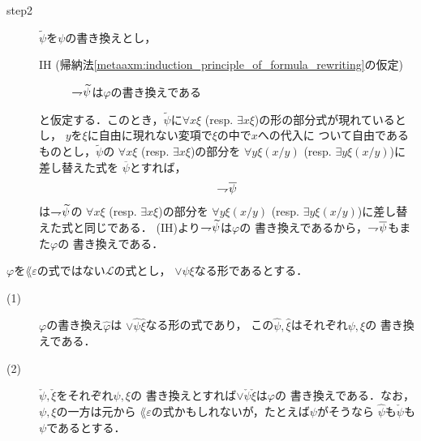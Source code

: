 \begin{metaprf}
\begin{description}
\begin{description}
					\item[step2]
						$\widetilde{\psi}$を$\psi$の書き換えとし，
						\begin{description}
							\item[IH (帰納法\ref{metaaxm:induction_principle_of_formula_rewriting}の仮定)]
								$\rightharpoondown\hspace{-0.25em} \widetilde{\psi}$は$\varphi$の書き換えである
						\end{description}
						と仮定する．このとき，$\widetilde{\psi}$に$\forall x \xi$ 
						(resp. $\exists x \xi$)の形の部分式が現れているとし，
						$y$を$\xi$に自由に現れない変項で$\xi$の中で$x$への代入に
						ついて自由であるものとし，$\widetilde{\psi}$の
						$\forall x \xi$ (resp. $\exists x \xi$)の部分を
						$\forall y \xi(x/y)$
						(resp. $\exists y \xi(x/y)$)に差し替えた式を
						$\overline{\psi}$とすれば，
						\begin{align}
							\rightharpoondown\hspace{-0.25em} \overline{\psi}
						\end{align}
						は$\rightharpoondown\hspace{-0.25em} \widetilde{\psi}$の
						$\forall x \xi$ (resp. $\exists x \xi$)の部分を
						$\forall y \xi(x/y)$
						(resp. $\exists y \xi(x/y)$)に差し替えた式と同じである．
						(IH)より$\rightharpoondown\hspace{-0.25em} \widetilde{\psi}$は$\varphi$の
						書き換えであるから，$\rightharpoondown\hspace{-0.25em} \overline{\psi}$もまた$\varphi$の
						書き換えである．
						\QED
				\end{description}
		\end{description}
	\end{metaprf}
	
	\begin{screen}
		\begin{metathm}[部分式の書き換えとの関係2]
		\label{metathm:relation_to_subformula_rewriting_2}
			$\varphi$を$\lang{\varepsilon}$の式ではない$\mathcal{L}$の式とし，
			$\vee \psi \xi$なる形であるとする．
			\begin{description}
				\item[(1)] $\varphi$の書き換え$\widehat{\varphi}$は
					$\vee \widehat{\psi} \widehat{\xi}$なる形の式であり，
					この$\widehat{\psi},\widehat{\xi}$はそれぞれ$\psi,\xi$の
					書き換えである．
					
				\item[(2)] $\check{\psi},\check{\xi}$をそれぞれ$\psi,\xi$の
					書き換えとすれば$\vee \check{\psi} \check{\xi}$は$\varphi$の
					書き換えである．なお，$\psi,\xi$の一方は元から
					$\lang{\varepsilon}$の式かもしれないが，たとえば$\psi$がそうなら
					$\widehat{\psi}$も$\check{\psi}$も$\psi$であるとする．
			\end{description}
		\end{metathm}
	\end{screen}
	
